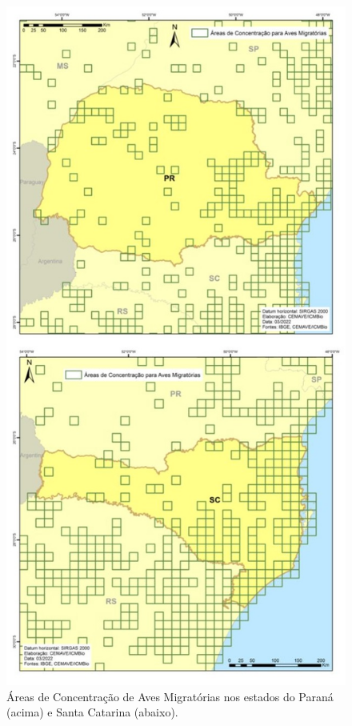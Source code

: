 \documentclass[
  oneside]{scrbook}
\begin{document}
\begin{figure}[H]

{\centering \includegraphics[width=0.7\linewidth]{imagens/cap07/Fig_23_PR_SC} 

}

\caption{Áreas de Concentração de Aves Migratórias nos estados do Paraná (acima) e Santa Catarina (abaixo).}\label{fig:43}
\end{figure}
\end{document}
